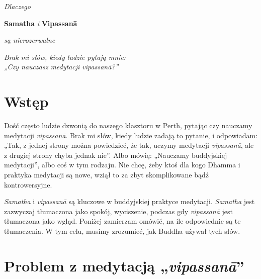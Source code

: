 \documentclass[12pt,openany]{book}
\begin{document}
\newpage

\begin{center}\end{center}
\begin{center}

\vfill

{\huge \textit{Dlaczego} 

\medskip

\textbf{Samatha} \textit{i} \textbf{Vipassanā} 

\bigskip

\textit{są nierozerwalne}}

\vfill


\vfill
\end{center}

 \newpage

\begin{center}\end{center}
\begin{center}

\vfill

\textit{\large Brak mi słów, kiedy ludzie pytają mnie: \\„Czy nauczasz medytacji vipassanā?”}

\vfill

\end{center}

\newpage
\mainmatter
\chapter*{Wstęp}

Dość często ludzie dzwonią do naszego klasztoru w Perth, pytając czy nauczamy medytacji \textit{vipassanā}. Brak mi słów, kiedy ludzie zadają to pytanie, i odpowiadam: „Tak, z jednej strony można powiedzieć, że tak, uczymy medytacji \textit{vipassanā}, ale z drugiej strony chyba jednak nie”. Albo mówię: „Nauczamy buddyjskiej medytacji”, albo coś w tym rodzaju. Nie chcę, żeby ktoś dla kogo Dhamma i praktyka medytacji są nowe, wziął to za zbyt skomplikowane bądź kontrowersyjne.

\textit{Samatha} i \textit{vipassanā} są kluczowe w buddyjskiej praktyce medytacji. \textit{Samatha} jest zazwyczaj tłumaczona jako spokój, wyciszenie, podczas gdy \textit{vipassanā} jest tłumaczona jako wgląd. Poniżej zamierzam omówić, na ile odpowiednie są te tłumaczenia. W tym celu, musimy zrozumieć, jak Buddha używał tych słów.

\chapter*{Problem z medytacją „\textit{vipassanā}”}
\end{document}
